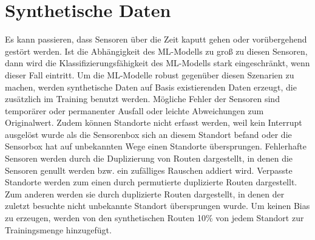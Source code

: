 \section{Synthetische Daten}
Es kann passieren, dass Sensoren über die Zeit kaputt gehen oder vorübergehend gestört werden.
Ist die Abhängigkeit des ML-Modells zu groß zu diesen Sensoren, dann wird die Klassifizierungsfähigkeit des ML-Modells stark eingeschränkt, wenn dieser Fall eintritt.
Um die ML-Modelle robust gegenüber diesen Szenarien zu machen, werden synthetische Daten auf Basis existierenden Daten erzeugt, die zusätzlich im Training benutzt werden.
\newline
\newline
Mögliche Fehler der Sensoren sind temporärer oder permanenter Ausfall oder leichte Abweichungen zum Originalwert.
Zudem können Standorte nicht erfasst werden, weil kein Interrupt ausgelöst wurde als die Sensorenbox sich an diesem Standort befand
oder die Sensorbox hat auf unbekannten Wege einen Standorte übersprungen.
\newline
\newline
Fehlerhafte Sensoren werden durch die Duplizierung von Routen dargestellt, in denen die Sensoren genullt werden bzw. ein zufälliges Rauschen addiert wird.
Verpasste Standorte werden zum einen durch permutierte duplizierte Routen dargestellt.
Zum anderen werden sie durch duplizierte Routen dargestellt, in denen der zuletzt besuchte nicht unbekannte Standort übersprungen wurde.
Um keinen Bias zu erzeugen, werden von den synthetischen Routen 10\% von jedem Standort zur Trainingsmenge hinzugefügt.